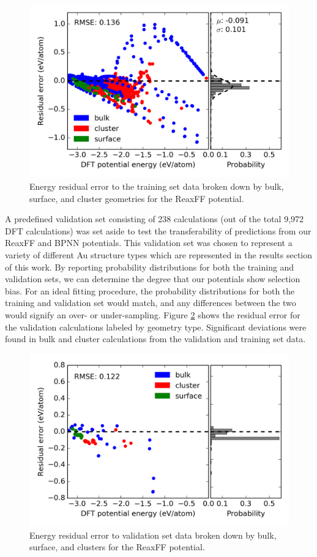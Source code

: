 \documentclass[12pt]{cmuthesis}
\begin{document}
\begin{figure}[h]
\centering
\includegraphics[width=5in]{./images/fig-reax-train.png}
\caption{\label{fig-reax-train}
Energy residual error to the training set data broken down by bulk, surface, and cluster geometries for the ReaxFF potential.}
\end{figure}

A predefined validation set consisting of 238 calculations (out of the total 9,972 DFT calculations) was set aside to test the transferability of predictions from our ReaxFF and BPNN potentials. This validation set was chosen to represent a variety of different Au structure types which are represented in the results section of this work. By reporting probability distributions for both the training and validation sets, we can determine the degree that our potentials show selection bias. For an ideal fitting procedure, the probability distributions for both the training and validation set would match, and any differences between the two would signify an over- or under-sampling. Figure \ref{fig-reax-valid} shows the residual error for the validation calculations labeled by geometry type. Significant deviations were found in bulk and cluster calculations from the validation and training set data.

\begin{figure}[h]
\centering
\includegraphics[width=5in]{./images/fig-reax-valid.png}
\caption{\label{fig-reax-valid}
Energy residual error to validation set data broken down by bulk, surface, and clusters for the ReaxFF potential.}
\end{figure}
\end{document}
